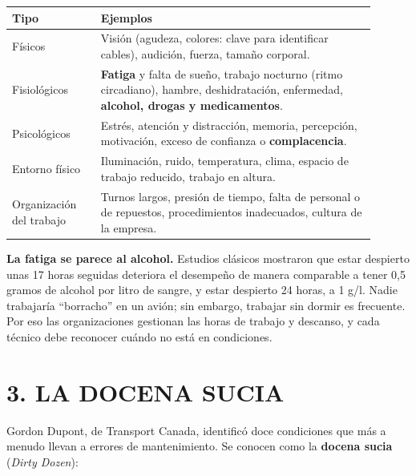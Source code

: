 \begin{center}
\small
\begin{tabular}{|p{0.22\linewidth}|p{0.68\linewidth}|}
\hline
\textbf{Tipo} & \textbf{Ejemplos} \\ \hline
Físicos & Visión (agudeza, colores: clave para identificar cables), audición, fuerza, tamaño
corporal. \\ \hline
Fisiológicos & \textbf{Fatiga} y falta de sueño, trabajo nocturno (ritmo circadiano), hambre,
deshidratación, enfermedad, \textbf{alcohol, drogas y medicamentos}. \\ \hline
Psicológicos & Estrés, atención y distracción, memoria, percepción, motivación, exceso de
confianza o \textbf{complacencia}. \\ \hline
Entorno físico & Iluminación, ruido, temperatura, clima, espacio de trabajo reducido, trabajo en
altura. \\ \hline
Organización del trabajo & Turnos largos, presión de tiempo, falta de personal o de repuestos,
procedimientos inadecuados, cultura de la empresa. \\ \hline
\end{tabular}
\end{center}

\begin{recuadro}
\textbf{La fatiga se parece al alcohol.} Estudios clásicos mostraron que estar despierto unas
17 horas seguidas deteriora el desempeño de manera comparable a tener 0,5 gramos de alcohol por
litro de sangre, y estar despierto 24 horas, a 1 g/l. Nadie trabajaría ``borracho'' en un avión;
sin embargo, trabajar sin dormir es frecuente. Por eso las organizaciones gestionan las horas de
trabajo y descanso, y cada técnico debe reconocer cuándo no está en condiciones.
\end{recuadro}

\section*{3. LA DOCENA SUCIA}

Gordon Dupont, de Transport Canada, identificó doce condiciones que más a menudo llevan a errores
de mantenimiento. Se conocen como la \textbf{docena sucia} (\textit{Dirty Dozen}):

